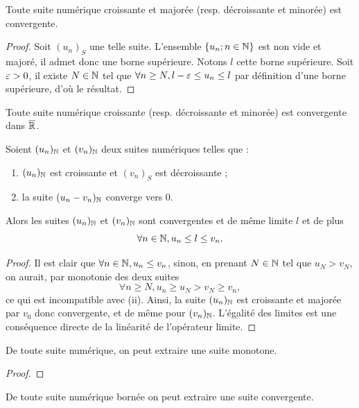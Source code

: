 \documentclass{article}
\begin{document}
\begin{thm}
Toute suite numérique croissante et majorée (resp. décroissante et minorée) est convergente.
\end{thm}

\begin{proof}
Soit $(u_n)_S$ une telle suite. L'ensemble $\{ u_n ; n \in \mathbb{N} \}$ est non vide et majoré, il admet donc une borne supérieure.
Notons $l$ cette borne supérieure. Soit $\varepsilon > 0$, il existe $N \in \mathbb{N}$ tel que $\forall n \geq N, l - \varepsilon \leq u_n \leq l $ par définition
d'une borne supérieure, d'où le résultat.
\end{proof}

\begin{coro}
Toute suite numérique croissante (resp. décroissante et minorée) est convergente dans $\overline{\mathbb{R}}$.
\end{coro}

\begin{thm}
Soient $(u_n)_{\mathbb{N}}$ et $(v_n)_{\mathbb{N}}$ deux suites numériques telles que :
\begin{enumerate}[label=(\roman*)]
\item $(u_n)_{\mathbb{N}}$ est croissante et $(v_n)_S$ est décroissante ;
\item la suite $(u_n-v_n)_{\mathbb{N}}$ converge vers 0.
\end{enumerate}
Alors les suites $(u_n)_{\mathbb{N}}$ et $(v_n)_{\mathbb{N}}$ sont convergentes et de même limite $l$ et de plus
\[ \forall n \in \mathbb{N}, u_n \leq l \leq v_n . \]
\end{thm}

\begin{proof}
Il est clair que $\forall n \in \mathbb{N}, u_n \leq v_n$, sinon, en prenant $N \in \mathbb{N}$ tel que $u_N > v_N$, on aurait, 
par monotonie des deux suites 
\[ \forall n \geq N, u_n \geq u_N > v_N \geq v_n , \]
ce qui est incompatible avec (ii).
Ainsi, la suite $(u_n)_{\mathbb{N}}$ est croissante et majorée par $v_0$ donc convergente, et de même pour $(v_n)_{\mathbb{N}}$.
L'égalité des limites est une conséquence directe de la linéarité de l'opérateur limite.
\end{proof}

\begin{thm}
De toute suite numérique, on peut extraire une suite monotone.
\end{thm}

\begin{proof}

\end{proof}

\begin{thm}
De toute suite numérique bornée on peut extraire une suite convergente.
\end{thm}
\end{document}
